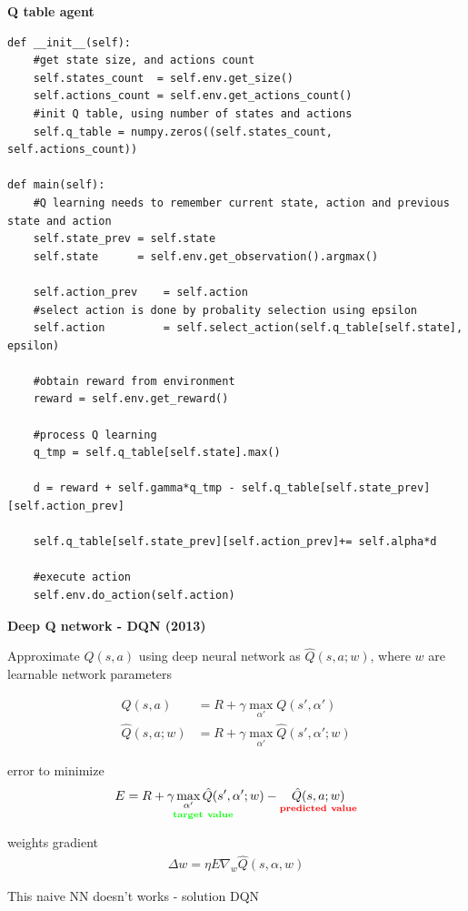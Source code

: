 \documentclass[xcolor=dvipsnames]{beamer}
\begin{document}
\begin{frame}[fragile]
{\bf Q table agent}


\begin{lstlisting}
def __init__(self):
    #get state size, and actions count
    self.states_count  = self.env.get_size()
    self.actions_count = self.env.get_actions_count()
    #init Q table, using number of states and actions
    self.q_table = numpy.zeros((self.states_count, self.actions_count))

def main(self):
    #Q learning needs to remember current state, action and previous state and action
    self.state_prev = self.state
    self.state      = self.env.get_observation().argmax()

    self.action_prev    = self.action
    #select action is done by probality selection using epsilon
    self.action         = self.select_action(self.q_table[self.state], epsilon)

    #obtain reward from environment
    reward = self.env.get_reward()

    #process Q learning
    q_tmp = self.q_table[self.state].max()

    d = reward + self.gamma*q_tmp - self.q_table[self.state_prev][self.action_prev]

    self.q_table[self.state_prev][self.action_prev]+= self.alpha*d

    #execute action
    self.env.do_action(self.action)
\end{lstlisting}


\end{frame}


\begin{frame}{\bf Deep Q network - DQN (2013)}

Approximate $Q(s, a)$ using deep neural network as $\hat{Q}(s, a; w)$, where $w$ are learnable network parameters

\begin{align*}
  Q(s, a) &= R + \gamma \max \limits_{\alpha'} Q(s', \alpha') \\
  \hat{Q}(s, a; w) &= R + \gamma \max \limits_{\alpha'} \hat{Q}(s', \alpha'; w)
\end{align*}

error to minimize
\begin{align*}
  E = \underset{\bf \color{green} target\ value}{R + \gamma \max \limits_{\alpha'} \hat{Q}(s', \alpha'; w)} - \underset{\bf \color{red} predicted\ value}{\hat{Q}(s, a; w) }
\end{align*}

weights gradient
\begin{align*}
  \Delta w = \eta E \nabla _w \hat{Q}(s, \alpha, w)
\end{align*}

This naive NN doesn't works - solution DQN

\end{frame}
\end{document}
